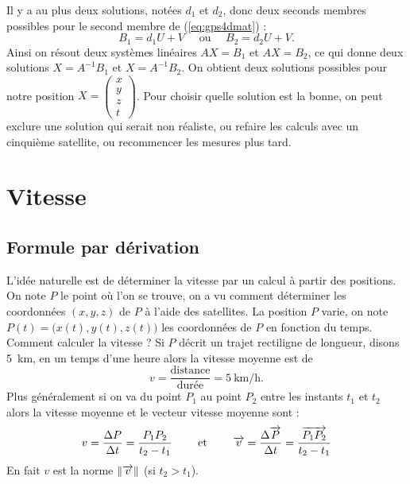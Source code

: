 \documentclass[class=report,crop=false]{standalone}
\begin{document}
Il y a au plus deux solutions, notées $d_1$ et $d_2$,
donc deux seconds membres possibles pour
le second membre de (\ref{eq:gps4dmat})  :
$$B_1 = d_1U+V \quad \text{ ou } \quad B_2 = d_2U+V.$$
Ainsi on résout deux systèmes linéaires
$AX=B_1$ et $AX=B_2$, ce qui donne 
deux solutions $X = A^{-1}B_1$ et $X = A^{-1}B_2$.
On obtient deux solutions possibles pour notre position 
$X=\left(\begin{smallmatrix}x\\y\\z\\t\end{smallmatrix}\right)$.
Pour choisir quelle solution est la bonne, on peut exclure une solution
qui serait non réaliste, ou refaire les calculs avec un cinquième satellite,
ou recommencer les mesures plus tard.

% 
% 
%   
% 


\section{Vitesse}

\subsection{Formule par dérivation}

L'idée naturelle est de déterminer la vitesse 
par un calcul à partir des positions.
On note $P$ le point où l'on se trouve, on a vu comment déterminer
les coordonnées $(x,y,z)$ de $P$ à l'aide des satellites.
La position $P$ varie,
on note $P(t) = \big(x(t),y(t),z(t)\big)$ les coordonnées de $P$ en fonction du temps.
Comment calculer la vitesse ? Si $P$ décrit un trajet rectiligne
de longueur,  disons \SI{5}{\kilo\meter}, en un temps d'une heure alors la vitesse moyenne est de 
$$v = \frac{\text{distance}}{\text{durée}} = \SI{5}{\kilo\meter\per\hour}.$$
Plus généralement si on va du point $P_1$ au point $P_2$ entre les instants $t_1$ et $t_2$ alors
la vitesse moyenne et le vecteur vitesse moyenne sont :
$$v = \frac{\Delta P}{\Delta t} = \frac{P_1P_2}{t_2-t_1} \qquad \text{ et } \qquad
\overrightarrow v = \frac{\Delta \overrightarrow{P}}{\Delta t} = \frac{\overrightarrow{P_1P_2}}{t_2-t_1}$$
En fait $v$ est la norme $\| \overrightarrow v\|$ (si $t_2>t_1$).
\end{document}
